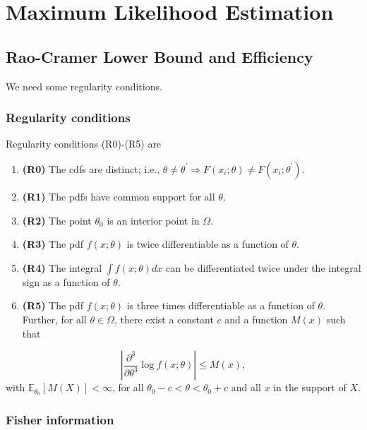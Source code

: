\section{Maximum Likelihood Estimation}

\subsection{Rao-Cramer Lower Bound and Efficiency}

We need some regularity conditions.

\subsubsection{Regularity conditions}

\begin{definition}
Regularity conditions (R0)-(R5) are
	\begin{enumerate}
		\item \textbf{(R0)} The cdfs are distinct; i.e., $\theta \neq \theta^{\prime} \Longrightarrow F(x_i ; \theta) \neq F(x_i ; \theta^{\prime})$.
		\item \textbf{(R1)} The pdfs have common support for all $\theta$.
		\item \textbf{(R2)} The point $\theta_0$ is an interior point in $\Omega$.
		\item \textbf{(R3)} The pdf $f(x ; \theta)$ is twice differentiable as a function of $\theta$.
		\item \textbf{(R4)} The integral $\int f(x ; \theta) d x$ can be differentiated twice under the integral sign as a function of $\theta$.
		\item \textbf{(R5)} The pdf $f(x ; \theta)$ is three times differentiable as a function of $\theta$. Further, for all $\theta \in \Omega$, there exist a constant $c$ and a function $M(x)$ such that
	\end{enumerate}
\[
\left|\frac{\partial^3}{\partial \theta^3} \log f(x ; \theta)\right| \leq M(x),
\]with $\mathbb{E}_{\theta_0}[M(X)]<\infty$, for all $\theta_0-c<\theta<\theta_0+c$ and all $x$ in the support of $X$.
\end{definition}
\subsubsection{Fisher information}

